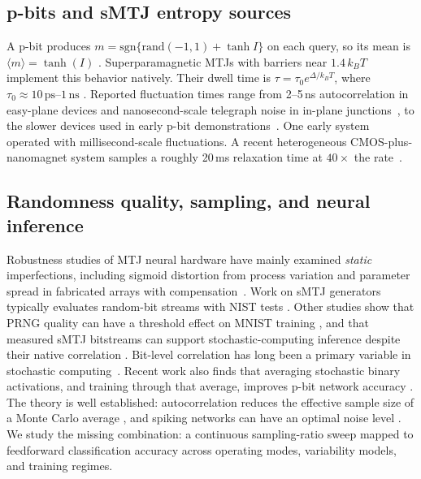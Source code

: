 \documentclass{ieeeaccess}
\begin{document}
\subsection{p-bits and sMTJ entropy sources}
A p-bit produces $m=\mathrm{sgn}\{\mathrm{rand}(-1,1)+\tanh I\}$ on each
query, so its mean is $\langle m\rangle=\tanh(I)$
\cite{camsari2017stochastic}. Superparamagnetic MTJs with barriers near
$1.4\,k_BT$~\cite{sun2026superparamagnetic} implement this behavior
natively. Their dwell time is $\tau=\tau_0e^{\Delta/k_BT}$, where
$\tau_0\approx10\,\mathrm{ps}$--$1\,\mathrm{ns}$
\cite{camsari2017stochastic}. Reported fluctuation times range from
2--5\,ns autocorrelation in easy-plane devices
\cite{safranski2021nanosecond} and nanosecond-scale telegraph noise in
in-plane junctions~\cite{hayakawa2021nanosecond}, to the slower devices
used in early p-bit demonstrations~\cite{borders2019integer}. One early
system operated with millisecond-scale fluctuations. A recent heterogeneous
CMOS-plus-nanomagnet system samples a roughly 20\,ms relaxation time at
$40\times$ the rate~\cite{singh2024cmos}.

\subsection{Randomness quality, sampling, and neural inference}
Robustness studies of MTJ neural hardware have mainly examined \emph{static}
imperfections, including sigmoid distortion from process variation
\cite{wood2020modular,zand2018composable} and parameter spread in fabricated
arrays with compensation~\cite{zhang2025automatic}. Work on sMTJ generators
typically evaluates random-bit streams with NIST tests
\cite{vodenicarevic2017low,sun2026superparamagnetic}. Other studies show
that PRNG quality can have a threshold effect on MNIST training
\cite{prng2025quality}, and that measured sMTJ bitstreams can support
stochastic-computing inference despite their native correlation
\cite{spintronicSC2025}. Bit-level correlation has long been a primary
variable in stochastic computing~\cite{alaghi2013survey,alaghi2013exploiting}.
Recent work also finds that averaging stochastic binary activations, and
training through that average, improves p-bit network accuracy
\cite{ghantasala2026sampling}. The theory is well established:
autocorrelation reduces the effective sample size of a Monte Carlo average
\cite{sokal1997monte}, and spiking networks can have an optimal noise level
\cite{timcheck2022optimal}. We study the missing combination: a continuous
sampling-ratio sweep mapped to feedforward classification accuracy across
operating modes, variability models, and training regimes.
\end{document}
